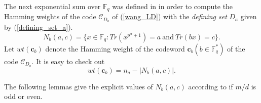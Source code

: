 \documentclass[final,1p,times]{elsarticle}
\begin{document}
  
  The next exponential sum over $ \mathbb{F}_{q} $ was defined in \cite{Bib7} in order to compute the Hamming weights of the code $ \mathcal{C}_{D_{a}} $ of (\ref{wang_LD}) with the \textit{defining set} $ D_{a} $ given by (\ref{defining_set_a}).
  \begin{equation}\label{Nac_set}
  N_{b}(a,c)=\biggl\lbrace x\in \mathbb{F}_{q}: Tr(x^{p^{\alpha}+1})=a\ \text{and}\ Tr(bx)=c\biggr\rbrace.
  \end{equation}
  Let $ wt(\mathbf{c}_{b}) $ denote the Hamming weight of the codeword $ \mathbf{c}_{b} (b\in \mathbb{F}_{q}^{*}) $ of the code $ \mathcal{C}_{D_{a}} $. It is easy to check out 
  \begin{equation}\label{wt_formula}
  wt(\mathbf{c}_{b})=n_{a}-|N_{b}(a,c)|.
  \end{equation}
  
  The following  lemmas give the explicit values of $ N_{b}(a,c) $ according to if $ m/d $ is odd or even.
  
\end{document}
